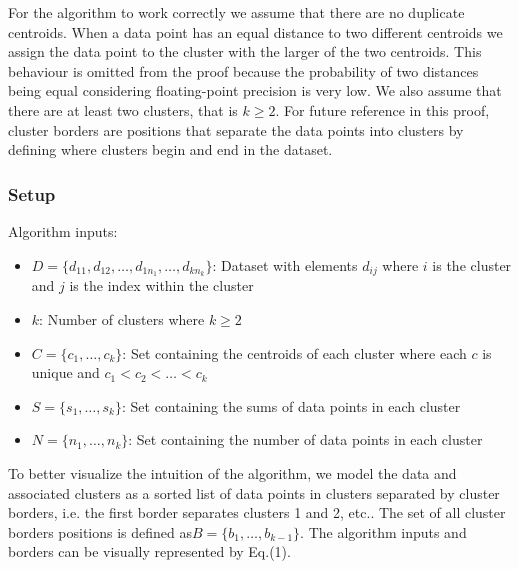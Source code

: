\documentclass[conference,compsoc]{IEEEtran}
\begin{document}
For the algorithm to work correctly we assume that there are no duplicate centroids. When a data point has an equal distance to two different centroids we assign the data point to the cluster with the larger of the two centroids. This behaviour is omitted from the proof because the probability of two distances being equal considering floating-point precision is very low. We also assume that there are at least two clusters, that is $k \geq 2$. For future reference in this proof, cluster borders are positions that separate the data points into clusters by defining where clusters begin and end in the dataset.

\subsubsection{Setup}
Algorithm inputs:
\begin{itemize}
\item $D = \{d_{11}, d_{12}, \dots , d_{1n_1}, \dots, d_{kn_k}\}$: Dataset with elements $d_{ij}$ where $i$ is the cluster and $j$ is the index within the cluster
\item $k$: Number of clusters where $k \geq 2$
\item $C = \{c_1, \dots, c_k\}$: Set containing the centroids of each cluster where each $c$ is unique and $c_1 < c_2 < \dots < c_k$
\item $S = \{s_1, \dots, s_k\}$: Set containing the sums of data points in each cluster
\item $N = \{n_1, \dots, n_k\}$: Set containing the number of data points in each cluster
\end{itemize}

To better visualize the intuition of the algorithm, we model the data and associated clusters as a sorted list of data points in clusters separated by cluster borders, i.e. the first border separates clusters 1 and 2, etc.. The set of all cluster borders positions is defined as$B = \{b_1, \dots, b_{k-1}\}$. The algorithm inputs and borders can be visually represented by Eq.(1).
\end{document}

